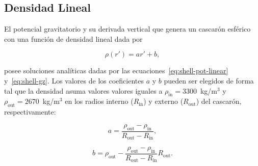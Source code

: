 \subsection{Densidad Lineal}

El potencial gravitatorio y su derivada vertical que genera un cascarón
esférico con una función de densidad lineal dada por

\begin{equation}
    \rho(r') = ar' + b,
    \label{eq:density-linear}
\end{equation}

\noindent posee soluciones analíticas dadas por las
ecuaciones~\ref{eq:shell-pot-linear} y~\ref{eq:shell-gz}. Los valores de los
coeficientes $a$ y $b$ pueden ser elegidos de forma tal que la densidad asuma
valores valores iguales a  $\rho_\text{in} = 3300$~kg/m$^3$ y
$\rho_\text{out} = 2670$~kg/m$^3$ en los radios interno ($R_\text{in}$)
y externo ($R_\text{out}$) del cascarón, respectivamente:

\begin{equation}
    a = \frac{\rho_\text{out} - \rho_\text{in}}{R_\text{out} - R_\text{in}},
\end{equation}

\begin{equation}
    b = \rho_\text{out} -
    \frac{\rho_\text{out} - \rho_\text{in}}{R_\text{out} - R_\text{in}} R_\text{out}.
\end{equation}


